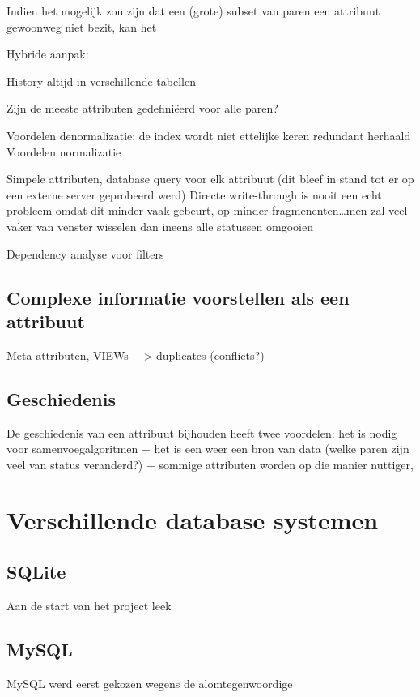 Indien het mogelijk zou zijn dat een (grote) subset van paren een attribuut gewoonweg niet bezit, kan het 

Hybride aanpak:

History altijd in verschillende tabellen


Zijn de meeste attributen gedefini\"eerd voor alle paren?

Voordelen denormalizatie: de index wordt niet ettelijke keren redundant herhaald
Voordelen normalizatie

Simpele attributen, database query voor elk attribuut (dit bleef in stand tot er op een externe server geprobeerd werd)
Directe write-through is nooit een echt probleem omdat dit minder vaak gebeurt, op minder fragmenenten\ldots men zal veel vaker van venster wisselen dan ineens alle statussen omgooien

Dependency analyse voor filters

\subsection{Complexe informatie voorstellen als een attribuut}
Meta-attributen, VIEWs ---> duplicates (conflicts?)

\subsection{Geschiedenis}
De geschiedenis van een attribuut bijhouden heeft twee voordelen: het is nodig voor samenvoegalgoritmen + het is een weer een bron van data (welke paren zijn veel van status veranderd?) + sommige attributen worden op die manier nuttiger, 

\section{Verschillende database systemen}

\subsection{SQLite}
Aan de start van het project leek

\subsection{MySQL}
MySQL werd eerst gekozen wegens de alomtegenwoordige

